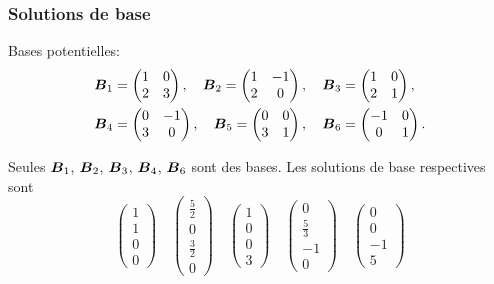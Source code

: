 \documentclass[usepdftitle=false]{beamer}
\begin{document}
\begin{frame}
\frametitle{Solutions de base}

Bases potentielles:
\begin{align*}
& {\boldsymbol{B}}_1 = \begin{pmatrix} 1 & 0 \\ 2 & 3 \end{pmatrix}, \quad
{\boldsymbol{B}}_2 = \begin{pmatrix} 1 & -1  \\ 2 & 0 \end{pmatrix}, \quad
{\boldsymbol{B}}_3 = \begin{pmatrix} 1 & 0 \\ 2 & 1 \end{pmatrix}, \\
& {\boldsymbol{B}}_4 = \begin{pmatrix} 0 & -1 \\ 3 & 0 \end{pmatrix}, \quad
{\boldsymbol{B}}_5 = \begin{pmatrix} 0 & 0 \\ 3 & 1 \end{pmatrix}, \quad
{\boldsymbol{B}}_6 = \begin{pmatrix} -1 & 0 \\ 0 & 1 \end{pmatrix}.
\end{align*}

Seules ${\boldsymbol{B}}_1$, ${\boldsymbol{B}}_2$, ${\boldsymbol{B}}_3$, ${\boldsymbol{B}}_4$, ${\boldsymbol{B}}_6$ sont des bases. Les solutions de base respectives sont
$$
\begin{pmatrix}
1 \\ 1 \\ 0 \\ 0
\end{pmatrix}
\quad
\begin{pmatrix}
\frac{5}{2} \\ 0 \\ \frac{3}{2} \\ 0
\end{pmatrix}
\quad
\begin{pmatrix}
1 \\ 0 \\ 0 \\ 3
\end{pmatrix}
\quad
\begin{pmatrix}
0 \\ \frac{5}{3} \\ -1 \\ 0
\end{pmatrix}
\quad
\begin{pmatrix}
0 \\ 0 \\ -1 \\ 5
\end{pmatrix}
$$

\end{frame}
\end{document}
